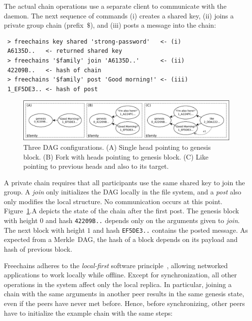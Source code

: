 \documentclass[10pt,journal,compsoc]{IEEEtran}
\newcommand{\FC}       {Freechains\xspace}
\begin{document}
The actual chain operations use a separate client to communicate with the
daemon.
The next sequence of commands (i) creates a shared key, (ii) joins a private
group chain (prefix~$\$$), and (iii) posts a message into the chain:

{\footnotesize
\begin{verbatim}
 > freechains key shared 'strong-password'   <- (i)
 A6135D..   <- returned shared key
 > freechains '$family' join 'A6135D..'      <- (ii)
 42209B..   <- hash of chain
 > freechains '$family' post 'Good morning!' <- (iii)
 1_EF5DE3.. <- hash of post
\end{verbatim}
}

\begin{figure}
\centering
\includegraphics[width=\textwidth]{family.png}
\caption{
    Three DAG configurations.
    (A) Single head pointing to genesis block.
    (B) Fork with heads pointing to genesis block.
    (C) Like pointing to previous heads and also to its target.
}
\label{fig.family}
\end{figure}

A private chain requires that all participants use the same shared key to join
the group.
A \emph{join} only initializes the DAG locally in the file system, and a
\emph{post} also only modifies the local structure.
No communication occurs at this point.
Figure~\ref{fig.family}.A depicts the state of the chain after the first post.
The genesis block with height $0$ and hash \texttt{42209B..}
depends only on the arguments given to \emph{join}.
The next block with height $1$ and hash \texttt{EF5DE3..} contains the posted
message.
As expected from a Merkle~DAG, the hash of a block depends on its payload and
hash of previous block.

\FC adheres to the \emph{local-first} software principle~\cite{p2p.local},
allowing networked applications to work locally while offline.
Except for synchronization, all other operations in the system affect only the
local replica.
In particular, joining a chain with the same arguments in another peer results
in the same genesis state, even if the peers have never met before.
Hence, before synchronizing, other peers have to initialize the example chain
with the same steps:
\end{document}
